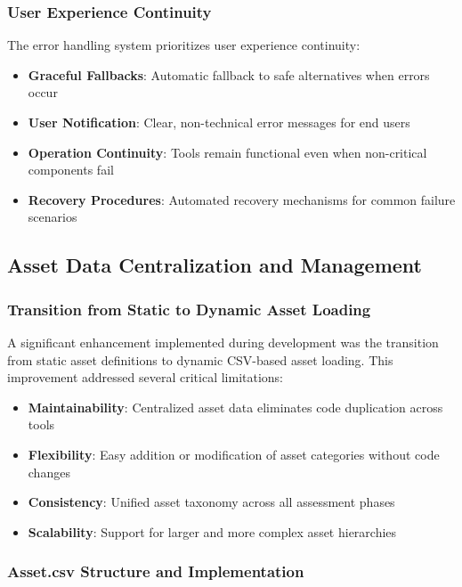 \documentclass[binding=0.6cm]{sapthesis}
\begin{document}
\subsubsection{User Experience Continuity}

The error handling system prioritizes user experience continuity:

\begin{itemize}
    \item \textbf{Graceful Fallbacks}: Automatic fallback to safe alternatives when errors occur
    \item \textbf{User Notification}: Clear, non-technical error messages for end users
    \item \textbf{Operation Continuity}: Tools remain functional even when non-critical components fail
    \item \textbf{Recovery Procedures}: Automated recovery mechanisms for common failure scenarios
\end{itemize}

\subsection{Asset Data Centralization and Management}

\subsubsection{Transition from Static to Dynamic Asset Loading}

A significant enhancement implemented during development was the transition from static asset definitions to dynamic CSV-based asset loading. This improvement addressed several critical limitations:

\begin{itemize}
    \item \textbf{Maintainability}: Centralized asset data eliminates code duplication across tools
    \item \textbf{Flexibility}: Easy addition or modification of asset categories without code changes
    \item \textbf{Consistency}: Unified asset taxonomy across all assessment phases
    \item \textbf{Scalability}: Support for larger and more complex asset hierarchies
\end{itemize}

\subsubsection{Asset.csv Structure and Implementation}
\end{document}
